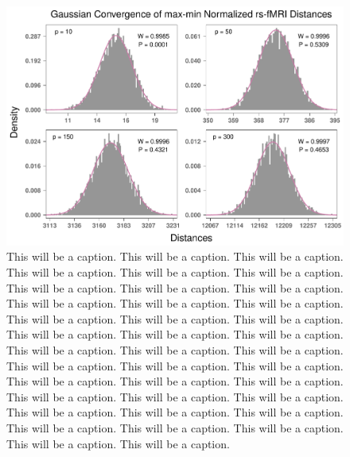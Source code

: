 \documentclass[10pt,letterpaper]{article}\usepackage[]{graphicx}\usepackage[]{color}
\begin{document}
\begin{figure}[H]
	\includegraphics[width=\textwidth]{central_limit_hist_rs-fMRI_max-min.pdf}
	\caption{This will be a caption. This will be a caption. This will be a caption. This will be a caption. This will be a caption. This will be a caption. This will be a caption. This will be a caption. This will be a caption. This will be a caption. This will be a caption. This will be a caption. This will be a caption. This will be a caption. This will be a caption. This will be a caption. This will be a caption. This will be a caption. This will be a caption. This will be a caption. This will be a caption. This will be a caption. This will be a caption. This will be a caption. This will be a caption. This will be a caption. This will be a caption. This will be a caption. This will be a caption. This will be a caption. This will be a caption. This will be a caption. This will be a caption. This will be a caption. This will be a caption. This will be a caption. This will be a caption. This will be a caption.}
\end{figure}

%
\end{document}
